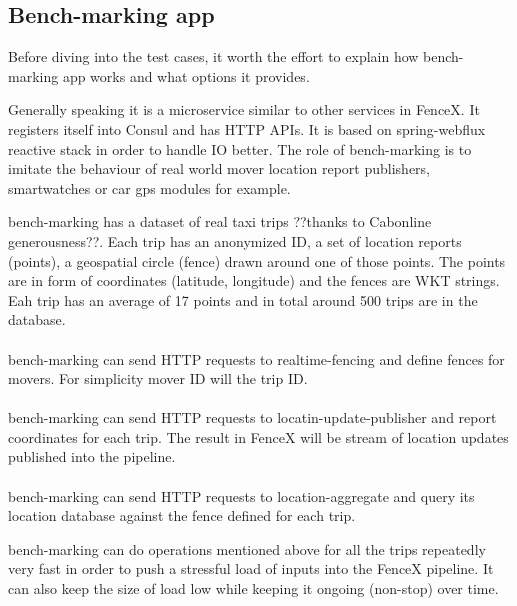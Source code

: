 \documentclass[a4]{report}
\begin{document}
    \subsection{Bench-marking app}
    Before diving into the test cases, it worth the effort to explain how bench-marking app works and what options it
    provides.

    Generally speaking it is a microservice similar to other services in FenceX.
    It registers itself into Consul and has HTTP APIs.
    It is based on spring-webflux reactive stack in order to handle IO better.
    The role of bench-marking is to imitate the behaviour of real world mover location report publishers,
    smartwatches or car gps modules for example.

    bench-marking has a dataset of real taxi trips ??thanks to Cabonline generousness??.
    Each trip has an anonymized ID, a set of location reports (points), a geospatial circle (fence) drawn around one of
    those
    points.
    The points are in form of coordinates (latitude, longitude) and the fences are WKT strings.
    Eah trip has an average of 17 points and in total around 500 trips are in the database.

    \paragraph{}
    bench-marking can send HTTP requests to realtime-fencing and define fences for movers.
    For simplicity mover ID will the trip ID.

    \paragraph{}
    bench-marking can send HTTP requests to locatin-update-publisher and report coordinates for each trip.
    The result in FenceX will be stream of location updates published into the pipeline.

    \paragraph{}
    bench-marking can send HTTP requests to location-aggregate and query its location database against the fence
    defined for each trip.

    bench-marking can do operations mentioned above for all the trips repeatedly very fast in order to push a
    stressful load of inputs into the FenceX pipeline.
    It can also keep the size of load low while keeping it ongoing (non-stop) over time.
\end{document}
